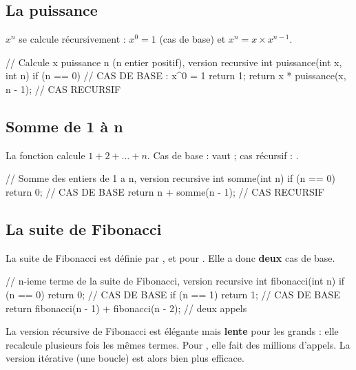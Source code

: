 \subsection{La puissance}

$x^n$ se calcule récursivement : $x^0 = 1$ (cas de base) et
$x^n = x \times x^{n-1}$.

\begin{codec}
// Calcule x puissance n (n entier positif), version recursive
int puissance(int x, int n) {
    if (n == 0) {            // CAS DE BASE : x^0 = 1
        return 1;
    }
    return x * puissance(x, n - 1);   // CAS RECURSIF
}
\end{codec}

\subsection{Somme de 1 à n}

La fonction  calcule $1 + 2 + \dots + n$. Cas de base :
 vaut  ; cas récursif : .

\begin{codec}
// Somme des entiers de 1 a n, version recursive
int somme(int n) {
    if (n == 0) {
        return 0;            // CAS DE BASE
    }
    return n + somme(n - 1); // CAS RECURSIF
}
\end{codec}

\subsection{La suite de Fibonacci}

La suite de Fibonacci est définie par ,  et
 pour . Elle a donc \textbf{deux} cas
de base.

\begin{codec}
// n-ieme terme de la suite de Fibonacci, version recursive
int fibonacci(int n) {
    if (n == 0) return 0;    // CAS DE BASE
    if (n == 1) return 1;    // CAS DE BASE
    return fibonacci(n - 1) + fibonacci(n - 2);   // deux appels
}
\end{codec}

\begin{remarque}
La version récursive de Fibonacci est élégante mais \textbf{lente} pour les grands
 : elle recalcule plusieurs fois les mêmes termes. Pour ,
elle fait des millions d'appels. La version itérative (une boucle) est alors bien
plus efficace.
\end{remarque}

